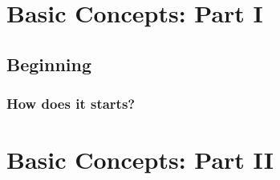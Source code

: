 \documentclass[twoside,a4paper,10pt]{book}
\begin{document}
\part{Basic Concepts: Part I}
\chapter{Beginning}
\section{How does it starts?}

\part{Basic Concepts: Part II}
\end{document}
